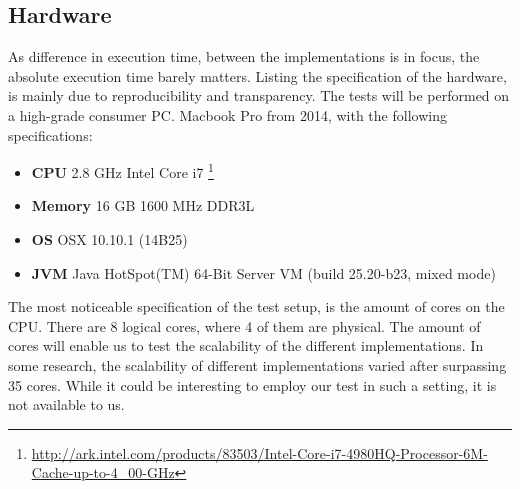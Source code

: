 %
%
\subsection{Hardware}\label{subsec:hardware}
As difference in execution time, between the implementations is in focus, the absolute execution time barely matters. Listing the specification of the hardware, is mainly due to reproducibility and transparency.
The tests will be performed on a high-grade consumer PC. Macbook Pro from 2014, with the following specifications:
\begin{itemize}
	\item \textbf{CPU} 2.8 GHz Intel Core i7 \footnote{\url{http://ark.intel.com/products/83503/Intel-Core-i7-4980HQ-Processor-6M-Cache-up-to-4_00-GHz}}
	\item \textbf{Memory} 16 GB 1600 MHz DDR3L
	\item \textbf{\ac{OS}} OSX 10.10.1 (14B25)
	\item \textbf{\ac{JVM}} Java HotSpot(TM) 64-Bit Server VM (build 25.20-b23, mixed mode)
\end{itemize}

The most noticeable specification of the test setup, is the amount of cores on the \ac{CPU}. There are 8 logical cores, where 4 of them are physical. The amount of cores will enable us to test the scalability of the different implementations. In some research\cite{harris2003language}, the scalability of different implementations varied after surpassing 35 cores. While it could be interesting to employ our test in such a setting, it is not available to us.

